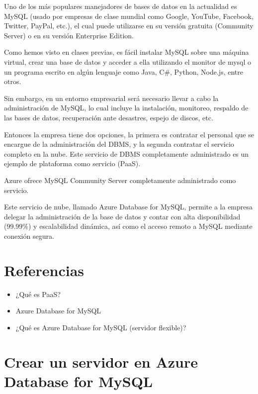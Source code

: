 Uno de los más populares manejadores de bases de datos en la actualidad es MySQL (usado por empresas de clase mundial como Google, YouTube, Facebook, Twitter, PayPal, etc.), el cual puede utilizarse en su versión gratuita (Community Server) o en su versión Enterprise Edition.

Como hemos visto en clases previas, es fácil instalar MySQL sobre una máquina virtual, crear una base de datos y acceder a ella utilizando el monitor de mysql o un programa escrito en algún lenguaje como Java, C\#, Python, Node.js, entre otros.

Sin embargo, en un entorno empresarial será necesario llevar a cabo la administración de MySQL, lo cual incluye la instalación, monitoreo, respaldo de las bases de datos, recuperación ante desastres, espejo de discos, etc.

Entonces la empresa tiene dos opciones, la primera es contratar el personal que se encargue de la administración del DBMS, y la segunda contratar el servicio completo en la nube. Este servicio de DBMS completamente administrado es un ejemplo de plataforma como servicio (PaaS).

Azure ofrece MySQL Community Server completamente administrado como servicio.

Este servicio de nube, llamado Azure Database for MySQL, permite a la empresa delegar la administración de la base de datos y contar con alta disponibilidad (99.99\%) y escalabilidad dinámica, así como el acceso remoto a MySQL mediante conexión segura.

\section{Referencias}

\begin{itemize}
\item ¿Qué es PaaS?
\item Azure Database for MySQL
\end{itemize}

\begin{itemize}
\item ¿Qué es Azure Database for MySQL (servidor flexible)?
\end{itemize}

\section{Crear un servidor en Azure Database for MySQL}

